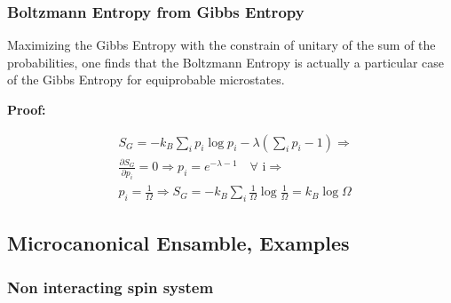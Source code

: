\documentclass{article}
\begin{document}
\subsubsection{Boltzmann Entropy from Gibbs Entropy}
Maximizing the Gibbs Entropy with the constrain of unitary of the sum of the probabilities, one finds that
the Boltzmann Entropy is actually a particular case of the Gibbs Entropy for equiprobable microstates.

\textbf{Proof:}

\begin{align*}
     & S_G = -k_B \sum_{i} p_i \log p_i - \lambda \left( \sum_{i} p_i - 1 \right) \Longrightarrow                            \\
     & \frac{\partial S_G}{\partial p_i} = 0 \Longrightarrow p_i = e^{-\lambda - 1} \quad \text{$\forall$ i} \Longrightarrow \\
     & p_i=\frac{1}{\Omega} \Longrightarrow S_G = -k_B \sum_{i} \frac{1}{\Omega} \log \frac{1}{\Omega} = k_B \log \Omega
\end{align*}

\newpage

\subsection{Microcanonical Ensamble, Examples}

\subsubsection{Non interacting spin system}
\end{document}
